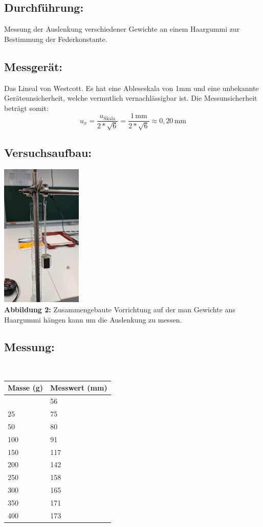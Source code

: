 \documentclass[11pt]{article}
\begin{document}
    \subsection{Durchführung:}
    Messung der Auslenkung verschiedener Gewichte an einem Haargummi zur
    Bestimmung der Federkonstante.

    \subsection{Messgerät:}
    Das Lineal von Westcott. Es hat eine Ableseskala von 1mm und eine
    unbekannte Geräteunsicherheit, welche vermutlich vernachlässigbar ist.
    Die Messunsicherheit beträgt somit:\\
    \[
    u_x = \frac{u_{\text{Skala}}}{2*\sqrt{6}} = \frac{1 \, \text{mm}}{2*\sqrt{6}} \approx 0,20 \, \text{mm}
    \]

    \subsection{Versuchsaufbau:}
    \begin{center}
    \includegraphics[width=0.29\textwidth]{PXL_20250107_114120921.jpg} \\
    \textbf{Abbildung 2:} Zusammengebaute Vorrichtung auf der man Gewichte ans Haargummi hängen kann um die Auslenkung zu messen.
    \end{center}
    
    
    \subsection{Messung:}\\
    \begin{longtable}[]{@{}ll@{}}
    \toprule\noalign{}
    Masse (g) & Messwert (mm) \\
    \midrule\noalign{}
    \endhead
    \bottomrule\noalign{}
    \endlastfoot
    0 & 56 \\
    25 & 75 \\
    50 & 80 \\
    100 & 91 \\
    150 & 117 \\
    200 & 142 \\
    250 & 158 \\
    300 & 165 \\
    350 & 171 \\
    400 & 173 \\
    \end{longtable}
\end{document}
